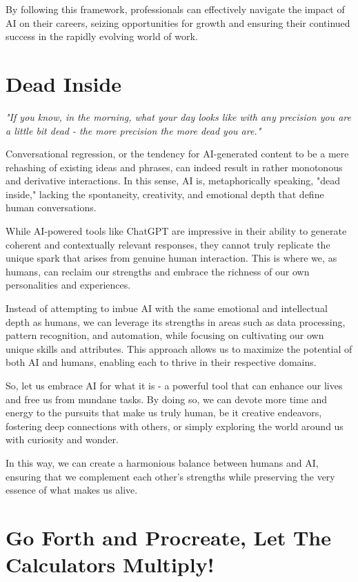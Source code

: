 By following this framework, professionals can effectively navigate the impact of AI on their careers, seizing opportunities for growth and ensuring their continued success in the rapidly evolving world of work.

\section{Dead Inside}

\textit{"If you know, in the morning, what your day looks like with any precision you are a little bit dead - the more precision the more dead you are."}

Conversational regression, or the tendency for AI-generated content to be a mere rehashing of existing ideas and phrases, can indeed result in rather monotonous and derivative interactions. In this sense, AI is, metaphorically speaking, "dead inside," lacking the spontaneity, creativity, and emotional depth that define human conversations.

While AI-powered tools like ChatGPT are impressive in their ability to generate coherent and contextually relevant responses, they cannot truly replicate the unique spark that arises from genuine human interaction. This is where we, as humans, can reclaim our strengths and embrace the richness of our own personalities and experiences.

Instead of attempting to imbue AI with the same emotional and intellectual depth as humans, we can leverage its strengths in areas such as data processing, pattern recognition, and automation, while focusing on cultivating our own unique skills and attributes. This approach allows us to maximize the potential of both AI and humans, enabling each to thrive in their respective domains.

So, let us embrace AI for what it is - a powerful tool that can enhance our lives and free us from mundane tasks. By doing so, we can devote more time and energy to the pursuits that make us truly human, be it creative endeavors, fostering deep connections with others, or simply exploring the world around us with curiosity and wonder.

In this way, we can create a harmonious balance between humans and AI, ensuring that we complement each other's strengths while preserving the very essence of what makes us alive.

\section{Go Forth and Procreate, Let The Calculators Multiply!}

